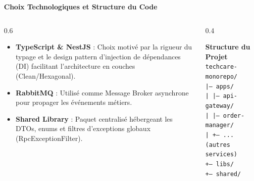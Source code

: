 \documentclass[10pt,aspectratio=169]{beamer}
\begin{document}
\begin{frame}{\textbf{Choix Technologiques et Structure du Code}}
    \begin{columns}
        \begin{column}{0.6\textwidth}
            \begin{itemize}
                \item \textbf{TypeScript \& NestJS} : Choix motivé par la rigueur du typage et le design pattern d'injection de dépendances (DI) facilitant l'architecture en couches (Clean/Hexagonal).
                \item \textbf{RabbitMQ} : Utilisé comme Message Broker asynchrone pour propager les événements métiers.
                \item \textbf{Shared Library} : Paquet centralisé hébergeant les DTOs, enums et filtres d'exceptions globaux (RpcExceptionFilter).
            \end{itemize}
        \end{column}
        \begin{column}{0.4\textwidth}
            \begin{block}{\textbf{Structure du Projet}}
                \texttt{techcare-monorepo/} \\
                \texttt{\quad |-- apps/} \\
                \texttt{\quad | \quad |-- api-gateway/} \\
                \texttt{\quad | \quad |-- order-manager/} \\
                \texttt{\quad | \quad +-- ... (autres services)} \\
                \texttt{\quad +-- libs/} \\
                \texttt{\quad \quad  +-- shared/}
            \end{block}
        \end{column}
    \end{columns}
\end{frame}
\end{document}
